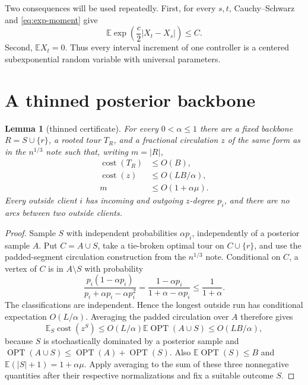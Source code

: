 \documentclass[11pt]{article}
\newtheorem{lemma}[theorem]{Lemma}
\theoremstyle{remark}
\newcommand{\E}{\mathbb E}
\newcommand{\opt}{\operatorname{OPT}}
\newcommand{\cost}{\operatorname{cost}}
\begin{document}
Two consequences will be used repeatedly.  First, for every $s,t$,
Cauchy--Schwarz and \eqref{eq:exp-moment} give
\begin{equation}\label{eq:increment-exp}
  \E\exp\!\left(\frac c2|X_t-X_s|\right)\le C.
\end{equation}
Second, $\E X_t=0$.  Thus every interval increment of one controller is a
centered subexponential random variable with universal parameters.

\section{A thinned posterior backbone}

\begin{lemma}[thinned certificate]\label{lem:thin}
For every $0<\alpha\le1$ there are a fixed backbone
$R=S\cup\{r\}$, a rooted tour $T_R$, and a fractional circulation $z$ of the
same form as in the $n^{1/3}$ note such that, writing $m=|R|$,
\begin{align}
 \cost(T_R)&\le O(B),\label{eq:tour-cost}\\
 \cost(z)&\le O(LB/\alpha),\label{eq:z-cost}\\
 m&\le O(1+\alpha\mu).\label{eq:m-size}
\end{align}
Every outside client $i$ has incoming and outgoing $z$-degree $p_i$, and
there are no arcs between two outside clients.
\end{lemma}

\begin{proof}
Sample $S$ with independent probabilities $\alpha p_i$, independently of a
posterior sample $A$.  Put $C=A\cup S$, take a tie-broken optimal tour on
$C\cup\{r\}$, and use the padded-segment circulation construction from the
$n^{1/3}$ note.  Conditional on $C$, a vertex of $C$ is in $A\setminus S$
with probability
\[
 \frac{p_i(1-\alpha p_i)}{p_i+\alpha p_i-\alpha p_i^2}
 =\frac{1-\alpha p_i}{1+\alpha-\alpha p_i}
 \le\frac1{1+\alpha}.
\]
The classifications are independent.  Hence the longest outside run has
conditional expectation $O(L/\alpha)$.  Averaging the padded circulation
over $A$ therefore gives
\[
 \E_S\cost(z^S)
 \le O(L/\alpha)\E\opt(A\cup S)
 \le O(LB/\alpha),
\]
because $S$ is stochastically dominated by a posterior sample and
$\opt(A\cup S)\le\opt(A)+\opt(S)$.  Also
$\E\opt(S)\le B$ and $\E(|S|+1)=1+\alpha\mu$.  Apply averaging to the sum of
these three nonnegative quantities after their respective normalizations and
fix a suitable outcome $S$.
\end{proof}
\end{document}
